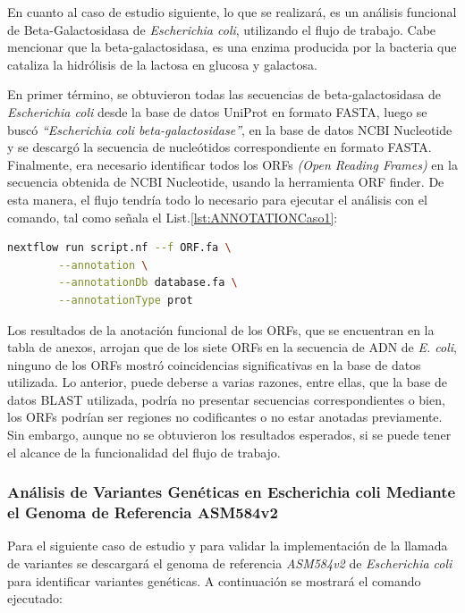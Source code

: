 \documentclass[12pt]{article}
\begin{document}
En cuanto al caso de estudio siguiente, lo que se realizará, 
es un análisis funcional de Beta-Galactosidasa de 
\textit{Escherichia coli}, utilizando el flujo de trabajo. 
Cabe mencionar que la beta-galactosidasa, es una enzima 
producida por la bacteria que cataliza la hidrólisis de la 
lactosa en glucosa y galactosa.

En primer término, se obtuvieron todas las secuencias de 
beta-galactosidasa de \textit{Escherichia coli} desde 
la base de datos 
UniProt en formato FASTA, luego se buscó \emph{“Escherichia 
coli beta-galactosidase”}, en la base de datos NCBI 
Nucleotide y se descargó la secuencia de nucleótidos 
correspondiente en formato FASTA. Finalmente, era necesario 
identificar todos los ORFs \emph{(Open Reading Frames)} en la secuencia 
obtenida de NCBI Nucleotide, usando la herramienta ORF finder. 
De esta manera, el flujo tendría todo lo necesario para 
ejecutar el análisis con el comando, tal como señala 
el List.\ref{lst:ANNOTATIONCaso1}:

\begin{center}
    \begin{lstlisting}[language=bash, caption=Comando para la anotación funcional de \textit{Escherichia coli} \emph{(elaboración propia)}., label=lst:ANNOTATIONCaso1]
        nextflow run script.nf --f ORF.fa \
        --annotation \
        --annotationDb database.fa \
        --annotationType prot
    \end{lstlisting}
\end{center}

Los resultados de la anotación funcional de los ORFs, que se encuentran en la 
tabla de anexos, arrojan que de los siete ORFs en la secuencia 
de ADN de \emph{E. coli}, 
ninguno de los ORFs mostró coincidencias significativas en 
la base de datos utilizada. 
Lo anterior, puede deberse a varias razones, entre ellas, que 
la base de datos 
BLAST utilizada, podría no presentar secuencias correspondientes 
o bien, los ORFs 
podrían ser regiones no codificantes o no estar anotadas previamente. 
Sin embargo, 
aunque no se obtuvieron los resultados esperados, si se puede tener el 
alcance de la 
funcionalidad del flujo de trabajo.

\subsubsection*{Análisis de Variantes Genéticas en Escherichia coli Mediante 
el Genoma de Referencia ASM584v2}

Para el siguiente caso de estudio y para validar la implementación de la 
llamada de variantes se descargará el genoma de referencia \emph{ASM584v2} de 
\textit{Escherichia coli} para identificar variantes genéticas. A continuación se mostrará 
el comando ejecutado:
\end{document}
